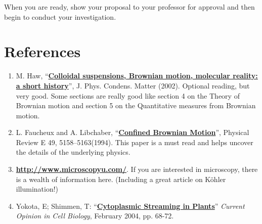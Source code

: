\documentclass{../lab}
\begin{document}
When you are ready, show your proposal to your professor for approval and then begin to conduct your investigation.



\section{References}
\label{sec:References}

\begin{enumerate}
    \item M. Haw, ``\href{https://drive.google.com/file/d/12qjilTmyHh_PirX9krW_1PGXvESI6Gqn/view?usp=drive_link}{\textbf{Colloidal suspensions, Brownian motion, molecular reality: a short history}}'', J. Phys. Condens. Matter (2002). Optional reading, but very good. Some sections are really good like section 4 on the Theory of Brownian motion and section 5 on the Quantitative measures from Brownian motion.

    \item L. Faucheux and A. Libchaber, ``\href{https://drive.google.com/file/d/1zPFUut2Utsbw_wNs2v3zPyMGuPeBIQj2/view?usp=drive_link}{\textbf{Confined Brownian Motion}}'', Physical Review E 49, 5158–5163(1994). This paper is a must read and helps uncover the details of the underlying physics.


    \item \href{http://www.microscopyu.com/}{\textbf{http://www.microscopyu.com/}}. If you are interested in microscopy, there is a wealth of information here. (Including a great article on K\"ohler illumination!)

    \item Yokota, E; Shimmen, T: ``\href{https://drive.google.com/file/d/1uBMlgd4n88L8w-YJkuGJaW-MsbbpESBN/view?usp=drive_link}{\textbf{Cytoplasmic Streaming in Plants}}'' \emph{Current Opinion in Cell Biology}, February 2004, pp. 68-72.


\end{enumerate}
\end{document}
